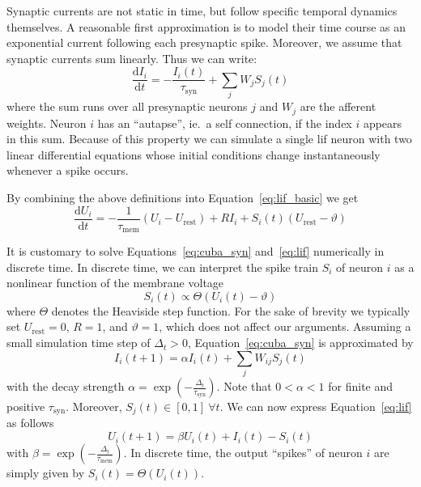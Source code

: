 \documentclass[journal,onecolumn,11pt]{IEEEtran}
\begin{document}
Synaptic currents are not static in time, but follow specific temporal dynamics
themselves. A reasonable first approximation is to model their time course as an
exponential current following each presynaptic spike. Moreover, we assume that
synaptic currents sum linearly. Thus we can write:
\begin{equation} 
    \frac{\mathrm{d}I_i}{\mathrm{d}t}= -\frac{I_i(t)}{\tau_\mathrm{syn}} + \sum_j W_j S_j(t)
    \label{eq:cuba_syn}
\end{equation}
where the sum runs over all presynaptic neurons $j$ and $W_j$ are the
afferent weights.  Neuron $i$ has an ``autapse'', ie.\ a self connection, if the
index $i$ appears in this sum.  Because of this property we can simulate a
single \gls{lif} neuron with two linear differential equations whose initial
conditions change instantaneously whenever a spike occurs.

By combining the above definitions into Equation~\eqref{eq:lif_basic} we get 
\begin{equation} 
    \frac{\mathrm{d}U_i}{\mathrm{d}t} = -\frac{1}{\tau_\mathrm{mem}}(U_i-U_\mathrm{rest}) + RI_i + S_i(t)(U_\mathrm{rest}-\vartheta)
    \label{eq:lif}
\end{equation}

It is customary to solve Equations~\eqref{eq:cuba_syn} and~\eqref{eq:lif}
numerically in discrete time.  In discrete time, we can interpret the spike
train $S_i$ of neuron $i$ as a nonlinear function of the membrane voltage
\begin{equation}
    S_i(t)\propto\Theta(U_i(t)-\vartheta)
    \label{eq:spike}
\end{equation}
where $\Theta$ denotes the Heaviside step function.  For the sake of brevity we
typically set $U_\mathrm{rest}=0$, $R=1$, and $\vartheta=1$, which does not affect our arguments.  
Assuming a small simulation time step of $\Delta_t>0$,
Equation~\eqref{eq:cuba_syn} is approximated by
\begin{equation}
  I_i(t+1) = \alpha I_i(t) + \sum_j W_{ij} S_j(t)
    \label{eq:syn_discrete_time}
\end{equation}
with the decay strength 
$\alpha=\exp\left(-\frac{\Delta_t}{\tau_\mathrm{syn}} \right)$.  Note that
$0<\alpha<1$ for finite and positive $\tau_\mathrm{syn}$.  Moreover, $S_j(t) \in
[0,1]~ \forall t$.  We can now express Equation~\eqref{eq:lif} as follows 
\begin{equation}
    U_i(t+1) = \beta U_i(t) + I_i(t) -S_i(t)
    \label{eq:mem_discrete_time}
\end{equation}
with $\beta=\exp\left(-\frac{\Delta_t}{\tau_\mathrm{mem}}\right)$.
In discrete time, the output ``spikes'' of neuron $i$ are simply given by $S_i(t)=\Theta(U_i(t))$.
\end{document}

